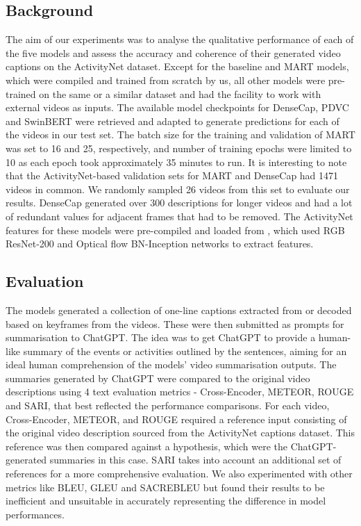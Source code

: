 \subsection{Background}
The aim of our experiments was to analyse the qualitative performance of each of the five models and assess the accuracy and coherence of their generated video captions on the ActivityNet dataset. Except for the baseline and MART models, which were compiled and trained from scratch by us, all other models were pre-trained on the same or a similar dataset and had the facility to work with external videos as inputs. The available model checkpoints for DenseCap, PDVC and SwinBERT were retrieved and adapted to generate predictions for each of the videos in our test set. The batch size for the training and validation of MART was set to 16 and 25, respectively, and number of training epochs were limited to 10 as each epoch took approximately 35 minutes to run. It is interesting to note that the ActivityNet-based validation sets for MART and DenseCap had 1471 videos in common. We randomly sampled 26 videos from this set to evaluate our results. DenseCap generated over 300 descriptions for longer videos and had a lot of redundant values for adjacent frames that had to be removed.
The ActivityNet features for these models were pre-compiled and loaded from \cite{dvc}, which used RGB ResNet-200 and Optical flow BN-Inception networks to extract features.

\subsection{Evaluation}
The models generated a collection of one-line captions extracted from or decoded based on keyframes from the videos. These were then submitted as prompts for summarisation to ChatGPT. The idea was to get ChatGPT to provide a human-like summary of the events or activities outlined by the sentences, aiming for an ideal human comprehension of the models' video summarisation outputs. The summaries generated by ChatGPT were compared to the original video descriptions using 4 text evaluation metrics - Cross-Encoder, METEOR, ROUGE and SARI, that best reflected the performance comparisons. For each video, Cross-Encoder, METEOR, and ROUGE required a reference input consisting of the original video description sourced from the ActivityNet captions dataset. This reference was then compared against a hypothesis, which were the ChatGPT-generated summaries in this case. SARI takes into account an additional set of references for a more comprehensive evaluation. We also experimented with other metrics like BLEU, GLEU and SACREBLEU but found their results to be inefficient and unsuitable in accurately representing the difference in model performances.

